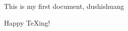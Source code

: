 \documentclass[a4paper,19pt]{article}
\begin{document}
This is my first document, dushishuang %
\begin{comment}
this is comment
\end{comment}
Happy \TeX ing!
\end{document}
